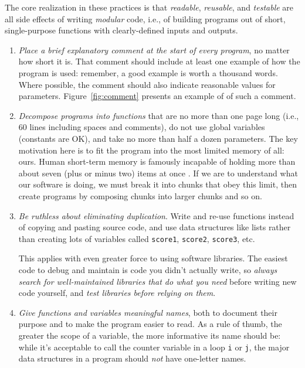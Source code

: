 \documentclass[10pt]{article}
\newcommand{\recommend}[1]{\textit{#1}}
\begin{document}
The core realization in these practices is that \emph{readable},
\emph{reusable}, and \emph{testable} are all side effects of writing
\emph{modular} code, i.e., of building programs out of short,
single-purpose functions with clearly-defined inputs and outputs.

\begin{enumerate}

\item
  \recommend{Place a brief explanatory comment at the start of every
    program}, no matter how short it is. That comment should include
  at least one example of how the program is used: remember, a good
  example is worth a thousand words. Where possible, the comment
  should also indicate reasonable values for parameters.
  Figure~\ref{fig:comment} presents an example of of such a comment.

\item
  \recommend{Decompose programs into functions} that are no more than
  one page long (i.e., 60 lines including spaces and comments), do not
  use global variables (constants are OK), and take no more than half
  a dozen parameters.  The key motivation here is to fit the program
  into the most limited memory of all: ours. Human short-term memory
  is famously incapable of holding more than about seven (plus or
  minus two) items at once \cite{miller1956}. If we are to understand
  what our software is doing, we must break it into chunks that obey
  this limit, then create programs by composing chunks into larger
  chunks and so on.

\item
  \recommend{Be ruthless about eliminating duplication}. Write and
  re-use functions instead of copying and pasting source code, and use
  data structures like lists rather than creating lots of variables
  called \texttt{score1}, \texttt{score2}, \texttt{score3}, etc.

  This applies with even greater force to using software
  libraries. The easiest code to debug and maintain is code you didn't
  actually write, so \recommend{always search for well-maintained
    libraries that do what you need} before writing new code yourself,
  and \recommend{test libraries before relying on them}.

\item
  \recommend{Give functions and variables meaningful names}, both to
  document their purpose and to make the program easier to read. As a
  rule of thumb, the greater the scope of a variable, the more
  informative its name should be: while it's acceptable to call the
  counter variable in a loop \texttt{i} or \texttt{j}, the major data
  structures in a program should \emph{not} have one-letter names.


\end{enumerate}
\end{document}
